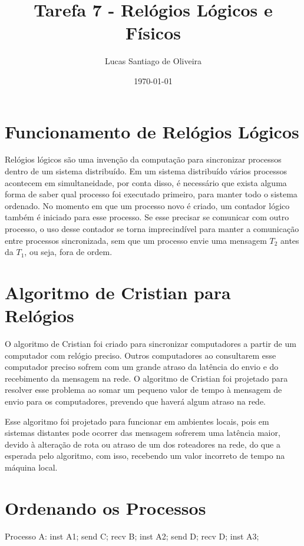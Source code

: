 \documentclass{article}
\title{Tarefa 7 - Relógios Lógicos e Físicos}
\author{Lucas Santiago de Oliveira}
\date{\today}
\begin{document}
    \maketitle

    \section{Funcionamento de Relógios Lógicos}

    Relógios lógicos são uma invenção da computação para sincronizar processos dentro de um sistema distribuído.
    Em um sistema distribuído vários processos acontecem em simultaneidade, por conta disso, é necessário que
    exista alguma forma de saber qual processo foi executado primeiro, para manter todo o sistema ordenado. 
    No momento em que um processo novo é criado, um contador lógico também é iniciado para esse processo. 
    Se esse precisar se comunicar com outro processo, o uso desse contador se torna imprecindível para manter
    a comunicação entre processos sincronizada, sem que um processo envie uma mensagem $T_2$ antes da $T_1$,
    ou seja, fora de ordem.

    \section{Algoritmo de Cristian para Relógios}

    O algoritmo de Cristian foi criado para sincronizar computadores a partir de um computador com relógio preciso.
    Outros computadores ao consultarem esse computador preciso sofrem com um grande atraso da latência do envio e do
    recebimento da mensagem na rede. O algoritmo de Cristian foi projetado para resolver esse problema ao somar
    um pequeno valor de tempo à mensagem de envio para os computadores, prevendo que haverá algum atraso na rede.

    Esse algoritmo foi projetado para funcionar em ambientes locais, pois em sistemas distantes pode ocorrer das 
    mensagem sofrerem uma latência maior, devido à alteração de rota ou atraso de um dos roteadores na rede,
    do que a esperada pelo algoritmo, com isso, recebendo um valor incorreto de tempo na máquina local.

    \section{Ordenando os Processos}

    Processo A: inst A1; send C; recv B; inst A2; send D; recv D; inst A3; 
\end{document}
